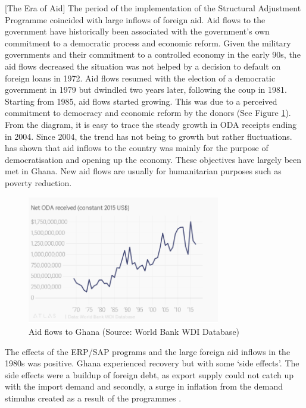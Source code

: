 \documentclass[a4paper, 12pt]{article}
\begin{document}
	[The Era of Aid]
	The period of the implementation of the Structural Adjustment Programme coincided with large inflows of foreign aid. Aid flows to the government have historically been associated with the government's own commitment to a democratic process and economic reform. Given the military governments and their commitment to a controlled economy in the early 90s, the aid flows decreased the situation was not helped by a decision to default on foreign loans in 1972. Aid flows resumed with the election of a democratic government in 1979 but dwindled two years later, following the coup in 1981. Starting from 1985, aid flows started growing. This was due to a perceived commitment to democracy and economic reform by the donors \cite{tsikata1999aid} (See Figure \ref{fig:aidflows}). From the diagram, it is easy to trace the steady growth in ODA receipts ending in 2004. Since 2004, the trend has not being to growth but rather fluctuations.  has shown that aid inflows to the country was mainly for the purpose of democratisation and opening up the economy. These objectives have largely been met in Ghana. New aid flows are usually for humanitarian purposes such as poverty reduction.
	
	\begin{figure}[h]
		\centering
		\includegraphics*[width=0.75\textwidth]{Data/oda.png}
		\caption[Aid flows to Ghana]{Aid flows to Ghana (Source: World Bank WDI Database)}
		\label{fig:aidflows}
	\end{figure}
	
	The effects of the ERP/SAP programs and the large foreign aid inflows in the 1980s was positive. Ghana experienced recovery but with some `side effects'. The side effects were a buildup of foreign debt, as export supply could not catch up with the import demand and secondly, a surge in inflation from the demand stimulus created as a result of the programmes \cite{StructuralAdj}.
	
\end{document}
